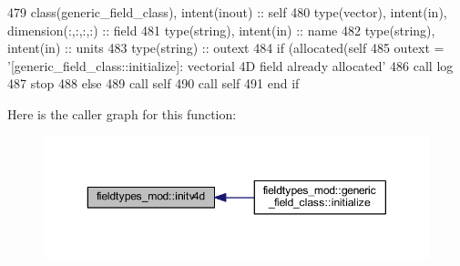 \begin{DoxyCode}
479     \textcolor{keywordtype}{class}(generic\_field\_class), \textcolor{keywordtype}{intent(inout)} :: self
480     \textcolor{keywordtype}{type}(vector), \textcolor{keywordtype}{intent(in)}, \textcolor{keywordtype}{dimension(:,:,:,:)} :: field
481     \textcolor{keywordtype}{type}(string), \textcolor{keywordtype}{intent(in)} :: name
482     \textcolor{keywordtype}{type}(string), \textcolor{keywordtype}{intent(in)} :: units
483     \textcolor{keywordtype}{type}(string) :: outext
484     \textcolor{keywordflow}{if} (\textcolor{keyword}{allocated}(self%
485         outext = \textcolor{stringliteral}{'[generic\_field\_class::initialize]: vectorial 4D field already allocated'}
486         \textcolor{keyword}{call }log%
487         stop
488     \textcolor{keywordflow}{else}
489         \textcolor{keyword}{call }self%
490         \textcolor{keyword}{call }self%
491 \textcolor{keywordflow}{    end if}
\end{DoxyCode}
Here is the caller graph for this function\+:\nopagebreak
\begin{figure}[H]
\begin{center}
\leavevmode
\includegraphics[width=350pt]{namespacefieldtypes__mod_a08d665678bea0956a323d08863e164e5_icgraph}
\end{center}
\end{figure}
\mbox{\label{namespacefieldtypes__mod_ac3e3d9aabba3893d61583e890e3bdf41}} 
